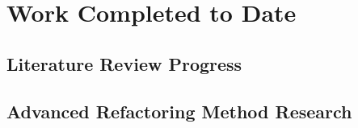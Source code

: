 \section{Work Completed to Date}

\subsection{Literature Review Progress}

\subsection{Advanced Refactoring Method Research}

